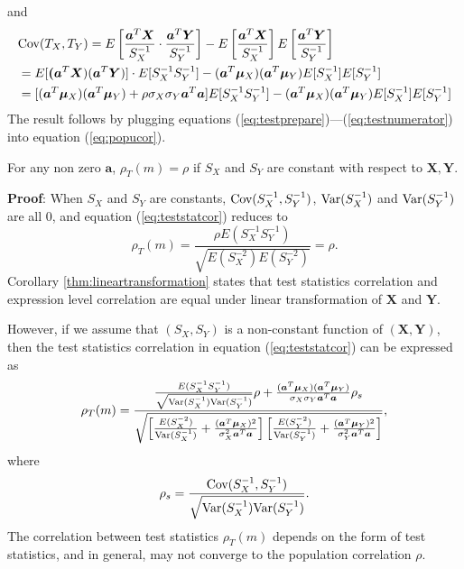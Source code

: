 and
\begin{equation}\label{eq:testnumerator}
\begin{aligned}
&\text{Cov}(T_X, T_Y) = E\left[\frac{ \bm a^T\bm X }{S_X^{-1}}\cdot\frac{ \bm a^T\bm Y 
}{S_Y^{-1}}\right] - E\left[\frac{\bm a^T\bm X}{S_X^{-1}}\right]E\left[\frac{\bm a^T\bm 
Y}{S_Y^{-1}}\right] \\
& = E[\bm (\bm a^T\bm X)(\bm a^T\bm Y)]\cdot E[S_X^{-1}S_Y^{-1}]-(\bm a^T\bm \mu_X)(\bm a^T\bm 
\mu_Y)E[S_X^{-1}]E[S_Y^{-1}]\\
& = [(\bm a^T\bm \mu_X)(\bm a^T\bm \mu_Y)+ \rho \sigma_X\sigma_Y\bm a^T\bm 
a]E[S_X^{-1}S_Y^{-1}]- (\bm a^T\bm \mu_X)(\bm a^T\bm \mu_Y)E[S_X^{-1}]E[S_Y^{-1}]
\end{aligned}
\end{equation}	
The result follows by plugging equations (\ref{eq:testprepare})---(\ref{eq:testnumerator}) into 
equation (\ref{eq:popucor}).

\begin{corollary}\label{thm:lineartransformation} 
	For any non zero $\bm a$, $\rho_T(m)=\rho$ if $S_X$ and $S_Y$ are constant with respect to 
	$\bm X, \bm Y$. 
\end{corollary}
\textbf{Proof}: When $S_X$ and $S_Y$ are constants, $\text{Cov}(S_X^{-1}, S_Y^{-1})$, $\text{Var}(S_X^{-1}) 
$ and $\text{Var}(S_Y^{-1})$ are all 0, and equation (\ref{eq:teststatcor}) reduces to 
\begin{equation}
\rho_T(m) = \frac{\rho E(S_X^{-1}S_Y^{-1})}{\sqrt{E(S_X^{-2})E(S_Y^{-2})}} = \rho.
\end{equation}
Corollary \ref{thm:lineartransformation} states that test statistics correlation and expression 
level correlation are equal under linear transformation of $\bm X$ and $\bm Y$. 

However, if we 
assume that $(S_X, S_Y)$ is a non-constant function of $(\bm X, \bm Y)$, then the test 
statistics correlation in equation (\ref{eq:teststatcor}) can be expressed as  
\begin{equation}
\rho_T(m) = \frac{ \frac{E(S_X^{-1}S_Y^{-1})}
	{\sqrt{\text{Var}(S_X^{-1})\text{Var}(S_Y^{-1})}}\rho + \frac{(\bm a^T\bm \mu_X)(\bm a^T\bm 
		\mu_Y)}{\sigma_X\sigma_Y\bm a^T\bm a} \rho_s	
}{\sqrt{\left[ \frac{E(S_X^{-2})}{\text{Var}(S_X^{-1})} + \frac{(\bm a^T\bm \mu_X)^2}{\sigma_X^2\bm 
		a^T\bm a}\right]\left[ \frac{E(S_Y^{-2})}{\text{Var}(S_Y^{-1})} + \frac{(\bm a^T\bm 
		\mu_Y)^2}{\sigma_Y^2\bm a^T\bm a}\right]}}, 
\end{equation}
where 
\begin{equation}
\rho_s = \frac{\text{Cov}(S_X^{-1},S_Y^{-1})}{\sqrt{\text{Var}(S_X^{-1})\text{Var}(S_Y^{-1})}}.
\end{equation}
The correlation between test statistics $\rho_T(m)$ depends on the form of test statistics, and 
in general,  may not converge to the population correlation $\rho$. 

